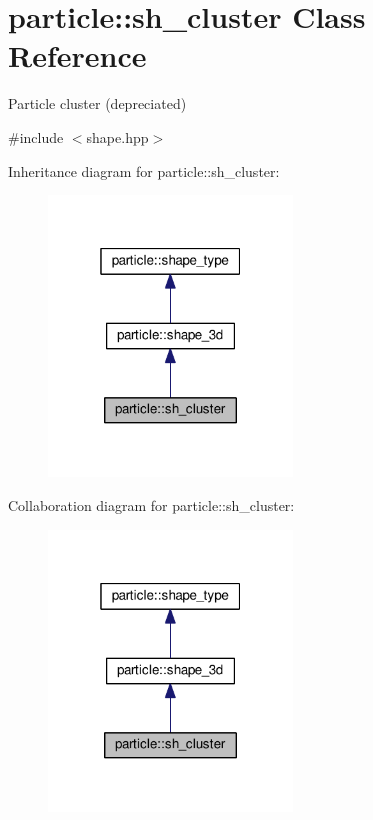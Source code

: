 \hypertarget{classparticle_1_1sh__cluster}{}\section{particle\+:\+:sh\+\_\+cluster Class Reference}
\label{classparticle_1_1sh__cluster}


Particle cluster (depreciated)  




{\ttfamily \#include $<$shape.\+hpp$>$}



Inheritance diagram for particle\+:\+:sh\+\_\+cluster\+:
\nopagebreak
\begin{figure}[H]
\begin{center}
\leavevmode
\includegraphics[width=184pt]{d8/d0b/classparticle_1_1sh__cluster__inherit__graph}
\end{center}
\end{figure}


Collaboration diagram for particle\+:\+:sh\+\_\+cluster\+:
\nopagebreak
\begin{figure}[H]
\begin{center}
\leavevmode
\includegraphics[width=184pt]{dc/d4e/classparticle_1_1sh__cluster__coll__graph}
\end{center}
\end{figure}
